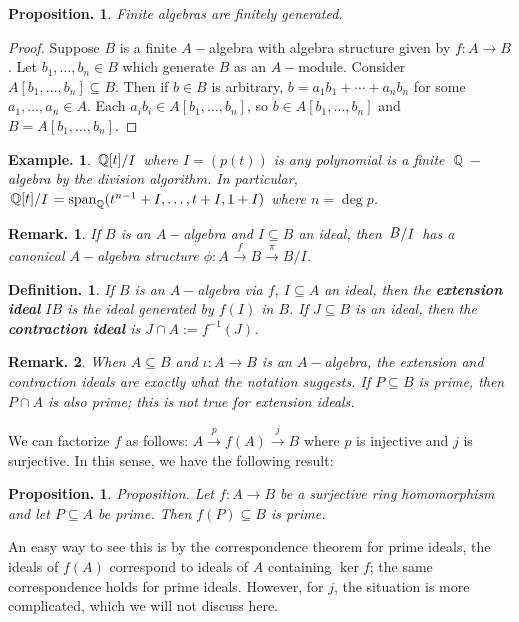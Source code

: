\documentclass[11pt, a4paper]{memoir}
\DeclareMathOperator{\Q}{{\mathbb{Q}}}
\newcommand{\fto}[1]{\ensuremath{\xrightarrow{\scriptstyle{#1}}}}
\theoremstyle{change}
\newtheorem{proposition}[theorem]{Proposition.}
\theoremstyle{plain}
\theoremstyle{nonumberplain}
\newtheorem{definition}{Definition.}
\newtheorem{example}{Example.}
\newtheorem{remark}{Remark.}
\newtheorem{proof}{Proof}
\DeclareMathOperator{\spn}{span}
\newcommand{\quot}[2]{\mathchoice{\left.\raisebox{0.10em}{$#1$}\middle/\raisebox{-0.10em}{$#2$}\right.}
                                 {\left.\raisebox{0.04em}{$#1$}\middle/\raisebox{-0.04em}{$#2$}\right.}
                                 {\left.\raisebox{0.01em}{$#1$}\middle/\raisebox{-0.01em}{$#2$}\right.}
                                 {\left.\raisebox{0em}{$#1$}\middle/\raisebox{0em}{$#2$}\right.}}
\numberwithin{equation}{section}
\begin{document}
\begin{proposition}
    Finite algebras are finitely generated.
\end{proposition}
\begin{proof}
    Suppose $B$ is a finite $A-$algebra with algebra structure given by $f:A\to B$.
    Let $b_1,\ldots,b_n\in B$ which generate $B$ as an $A-$module.
    Consider $A[b_1,\ldots,b_n]\subseteq B$.
    Then if $b\in B$ is arbitrary, $b=a_1b_1+\cdots+a_nb_n$ for some $a_1,\ldots,a_n\in A$.
    Each $a_ib_i\in A[b_1,\ldots,b_n]$, so $b\in A[b_1,\ldots,b_n]$ and $B=A[b_1,\ldots,b_n]$.
\end{proof}
\begin{example}
    $\quot{\Q[t]}{I}$ where $I=(p(t))$ is any polynomial is a finite $\Q-$algebra by the division algorithm.
    In particular, $\quot{\Q[t]}{I}=\spn_{\Q}(t^{n-1}+I,\ldots,t+I,1+I)$ where $n=\deg p$.
\end{example}
\begin{remark}
    If $B$ is an $A-$algebra and $I\subseteq B$ an ideal, then $\quot{B}{I}$ has a canonical $A-$algebra structure $\phi:A\fto{f} B\fto{\pi} B/I$.
\end{remark}
\begin{definition}
    If $B$ is an $A-$algebra via $f$, $I\subseteq A$ an ideal, then the \textbf{extension ideal} $IB$ is the ideal generated by $f(I)$ in $B$.
    If $J\subseteq B$ is an ideal, then the \textbf{contraction ideal} is $J\cap A:=f^{-1}(J)$.
\end{definition}
\begin{remark}
    When $A\subseteq B$ and $\iota:A\to B$ is an $A-$algebra, the extension and contraction ideals are exactly what the notation suggests.
    If $P\subseteq B$ is prime, then $P\cap A$ is also prime; this is not true for extension ideals.
\end{remark}
We can factorize $f$ as follows: $A\fto{p} f(A)\fto{j} B$ where $p$ is injective and $j$ is surjective.
In this sense, we have the following result:
\begin{proposition}
    Proposition. Let $f:A\to B$ be a surjective ring homomorphism and let $P\subseteq A$ be prime.
    Then $f(P)\subseteq B$ is prime.
\end{proposition}
An easy way to see this is by the correspondence theorem for prime ideals, the ideals of $f(A)$ correspond to ideals of $A$ containing $\ker f$; the same correspondence holds for prime ideals.
However, for $j$, the situation is more complicated, which we will not discuss here.
\end{document}

